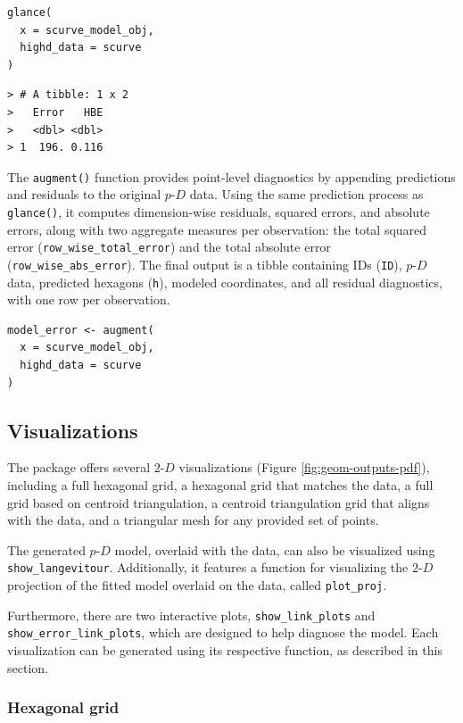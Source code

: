 \begin{verbatim}
glance(
  x = scurve_model_obj,
  highd_data = scurve
)
\end{verbatim}

\begin{verbatim}
> # A tibble: 1 x 2
>   Error   HBE
>   <dbl> <dbl>
> 1  196. 0.116
\end{verbatim}

The \texttt{augment()} function provides point-level diagnostics by appending predictions and residuals to the original \(p\text{-}D\) data. Using the same prediction process as \texttt{glance()}, it computes dimension-wise residuals, squared errors, and absolute errors, along with two aggregate measures per observation: the total squared error (\texttt{row\_wise\_total\_error}) and the total absolute error (\texttt{row\_wise\_abs\_error}). The final output is a tibble containing IDs (\texttt{ID}), \(p\text{-}D\) data, predicted hexagons (\texttt{h}), modeled coordinates, and all residual diagnostics, with one row per observation.

\begin{verbatim}
model_error <- augment(
  x = scurve_model_obj,
  highd_data = scurve
)
\end{verbatim}

\subsection{Visualizations}\label{visualizations}

The package offers several \(2\text{-}D\) visualizations (Figure \ref{fig:geom-outputs-pdf}), including a full hexagonal grid, a hexagonal grid that matches the data, a full grid based on centroid triangulation, a centroid triangulation grid that aligns with the data, and a triangular mesh for any provided set of points.

The generated \(p\text{-}D\) model, overlaid with the data, can also be visualized using \texttt{show\_langevitour}. Additionally, it features a function for visualizing the \(2\text{-}D\) projection of the fitted model overlaid on the data, called \texttt{plot\_proj}.

Furthermore, there are two interactive plots, \texttt{show\_link\_plots} and \texttt{show\_error\_link\_plots}, which are designed to help diagnose the model. Each visualization can be generated using its respective function, as described in this section.

\subsubsection{Hexagonal grid}\label{hexagonal-grid}

